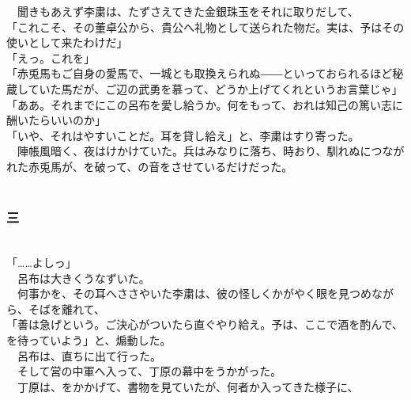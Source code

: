 \documentclass[
  paper=a5,
  fontsize=10pt,
  jafontsize=9.5pt,
  tate,                  %
  open_bracket_pos=nibu, %
]{jlreq}
\begin{document}
　聞きもあえず李粛は、たずさえてきた金銀珠玉をそれに取りだして、\\


「これこそ、その董卓公から、貴公へ礼物として送られた物だ。実は、予はその使いとして来たわけだ」\\


「えっ。これを」\\


「赤兎馬もご自身の愛馬で、一城とも取換えられぬ――といっておられるほど秘蔵していた馬だが、ご辺の武勇を慕って、どうか上げてくれというお言葉じゃ」\\


「ああ。それまでにこの呂布を愛し給うか。何をもって、おれは知己の篤い志に酬いたらいいのか」\\


「いや、それはやすいことだ。耳を貸し給え」と、李粛はすり寄った。\\


　陣帳風暗く、夜はけかけていた。兵はみなりに落ち、時おり、馴れぬにつながれた赤兎馬が、を破って、の音をさせているだけだった。\\

\\

\subsubsection{三}

\\


「……よしっ」\\


　呂布は大きくうなずいた。\\


　何事かを、その耳へささやいた李粛は、彼の怪しくかがやく眼を見つめながら、そばを離れて、\\


「善は急げという。ご決心がついたら直ぐやり給え。予は、ここで酒を酌んで、を待っていよう」と、煽動した。\\


　呂布は、直ちに出て行った。\\


　そして営の中軍へ入って、丁原の幕中をうかがった。\\


　丁原は、をかかげて、書物を見ていたが、何者か入ってきた様子に、\\
\end{document}
